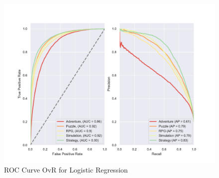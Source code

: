 \begin{figure}
    \centering
    \includegraphics[width=\textwidth]{data/results/plots/logistic_regression_roc}
    \caption{ROC Curve OvR for Logistic Regression}
    \label{fig:log_reg_roc}
\end{figure}